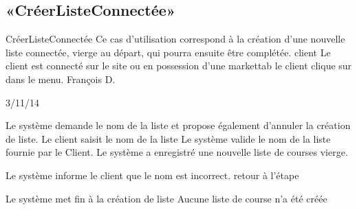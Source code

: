 \subsection{«CréerListeConnectée»}

\startCU
\nom CréerListeConnectée
\but Ce cas d’utilisation correspond à la création d’une nouvelle liste connectée, vierge au départ, qui pourra ensuite être complétée.
\acteur client
\precondition Le client est connecté sur le site ou en possession d'une markettab
\declenchement le client clique sur  dans le menu.
\auteur François D.
\date 03/11/14

\nominal %
\startnominal
{} Le système demande le nom de la liste et propose également d'annuler la création de liste.
 Le client saisit le nom de la liste
 Le système valide le nom de la liste fournie par le Client.
\stopnominal
\postcondition Le système a enregistré une nouvelle liste de courses vierge.

\alternatifs %
  \etape Le système informe le client que le nom est incorrect.
  \etape retour à l'étape 
\stopcondition
\stopalternatif

\exception %
  \etape Le système met fin à la création de liste
\stopcondition
\postcondition Aucune liste de course n'a été créée
\stopalternatif
\stopCU
